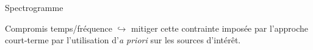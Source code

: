 \begin{frame}{Spectrogramme}
\begin{center}
\vspace{.4cm}
\hspace{.2cm}
\end{center}
\end{frame}


\begin{frame}{Compromis temps/fréquence}
	$\hookrightarrow{}$ mitiger cette contrainte imposée par l'approche court-terme par l'utilisation d'\alert{\textit{a priori}} sur les sources d'intérêt.
\end{frame}
